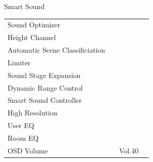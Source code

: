 \documentclass{beamer}
\begin{document}
\begin{frame}[t]{Smart Sound}
\begin{tiny}
\begin{tabular}{@{}lccc@{}}
Sound Optimizer & \color{black}{Off} & & \\
Height Channel & \color{black}{Off} & & \\
Automatic Scene Classificiation & \color{blue}{On} & & \\
Limiter & \color{black}{Off} & & \\
Sound Stage Expansion & \color{blue}{On} & & \\
Dynamic Range Control & \color{black}{Off} & & \\
Smart Sound Controller & \color{blue}{On} & & \\
High Resolution & \color{black}{Off} & & \\
User EQ & \color{black}{Off} & & \\
Room EQ & \color{black}{Off} & & \\
OSD Volume & \color{blue}{On} & Vol.40 & \\
\midrule
\end{tabular}
\end{tiny}

\end{frame}
\end{document}
